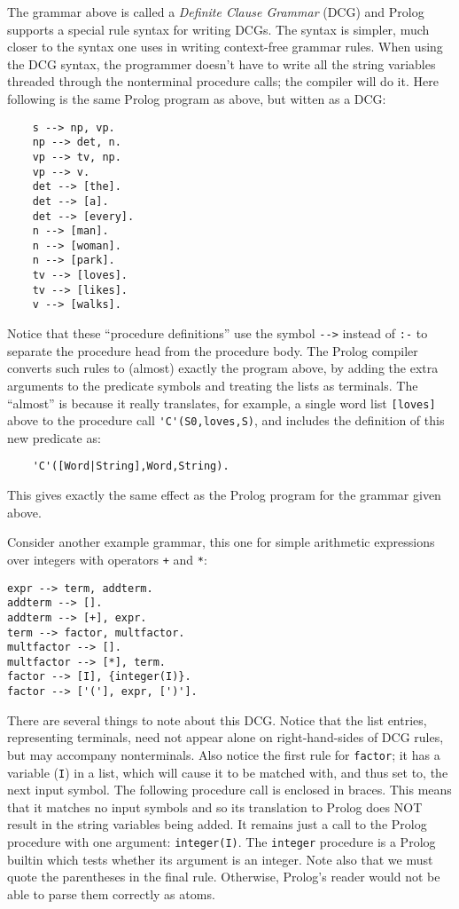 The grammar above is called a {\em Definite Clause Grammar} (DCG) and
Prolog supports a special rule syntax for writing DCGs.  The syntax is
simpler, much closer to the syntax one uses in writing context-free
grammar rules.  When using the DCG syntax, the programmer doesn't have
to write all the string variables threaded through the nonterminal
procedure calls; the compiler will do it.  Here following is the same
Prolog program as above, but witten as a DCG:
\begin{verbatim}
    s --> np, vp.
    np --> det, n.
    vp --> tv, np.
    vp --> v.
    det --> [the].
    det --> [a].
    det --> [every].
    n --> [man].
    n --> [woman].
    n --> [park].
    tv --> [loves].
    tv --> [likes].
    v --> [walks].
\end{verbatim}
Notice that these ``procedure definitions'' use the symbol \verb|-->|
instead of \verb|:-| to separate the procedure head from the procedure
body.  The Prolog compiler converts such rules to (almost) exactly the
program above, by adding the extra arguments to the predicate symbols
and treating the lists as terminals.  The ``almost'' is because it
really translates, for example, a single word list \verb|[loves]|
above to the procedure call \verb|'C'(S0,loves,S)|, and includes the
definition of this new predicate as:
\begin{verbatim}
    'C'([Word|String],Word,String).
\end{verbatim}
This gives exactly the same effect as the Prolog program for the
grammar given above.

Consider another example grammar, this one for simple arithmetic
expressions over integers with operators \verb|+| and \verb|*|:
\begin{verbatim}
expr --> term, addterm.
addterm --> [].
addterm --> [+], expr.
term --> factor, multfactor.
multfactor --> [].
multfactor --> [*], term.
factor --> [I], {integer(I)}.
factor --> ['('], expr, [')'].
\end{verbatim}
There are several things to note about this DCG.  Notice that the list
entries, representing terminals, need not appear alone on
right-hand-sides of DCG rules, but may accompany nonterminals.  Also
notice the first rule for \verb|factor|; it has a variable (\verb|I|)
in a list, which will cause it to be matched with, and thus set to,
the next input symbol.  The following procedure call is enclosed in
braces.  This means that it matches no input symbols and so its
translation to Prolog does NOT result in the string variables being
added.  It remains just a call to the Prolog procedure with one
argument: \verb|integer(I)|.  The \verb|integer| procedure is a Prolog
builtin which tests whether its argument is an integer.  Note also
that we must quote the parentheses in the final rule.  Otherwise,
Prolog's reader would not be able to parse them correctly as atoms.


